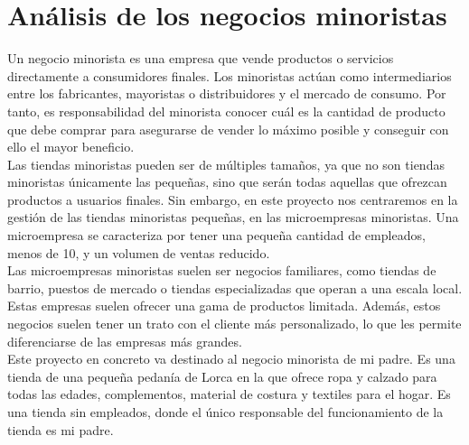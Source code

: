 \chapter{Análisis de los negocios minoristas}
\label{chap:StoreAnalysis}

Un negocio minorista es una empresa que vende productos o servicios directamente a consumidores finales. Los minoristas actúan como intermediarios entre los fabricantes, mayoristas o distribuidores y el mercado de consumo. Por tanto, es responsabilidad del minorista conocer cuál es la cantidad de producto que debe comprar para asegurarse de vender lo máximo posible y conseguir con ello el mayor beneficio. \\

Las tiendas minoristas pueden ser de múltiples tamaños, ya que no son tiendas minoristas únicamente las pequeñas, sino que serán todas aquellas que ofrezcan productos a usuarios finales. Sin embargo, en este proyecto nos centraremos en la gestión de las tiendas minoristas pequeñas, en las microempresas minoristas. Una microempresa se caracteriza por tener una pequeña cantidad de empleados, menos de 10, y un volumen de ventas reducido. \\

Las microempresas minoristas suelen ser negocios familiares, como tiendas de barrio, puestos de mercado o tiendas especializadas que operan a una escala local. Estas empresas suelen ofrecer una gama de productos limitada. Además, estos negocios suelen tener un trato con el cliente más personalizado, lo que les permite diferenciarse de las empresas más grandes. \\

Este proyecto en concreto va destinado al negocio minorista de mi padre. Es una tienda de una pequeña pedanía de Lorca en la que ofrece ropa y calzado para todas las edades, complementos, material de costura y textiles para el hogar. Es una tienda sin empleados, donde el único responsable del funcionamiento de la tienda es mi padre.  


